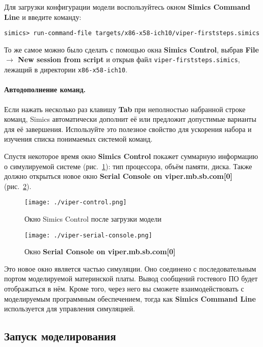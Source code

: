 Для загрузки конфигурации модели воспользуйтесь окном \textbf{Simics Command Line} и введите команду:

\begin{lstlisting}
simics> run-command-file targets/x86-x58-ich10/viper-firststeps.simics
\end{lstlisting}

То же самое можно было сделать с помощью окна \textbf{Simics Control}, выбрав \textbf{File $\to$ New session from script} и открыв файл \texttt{viper-firststeps.simics}, лежащий в директории \texttt{x86-x58-ich10}.

\paragraph{Автодополнение команд.} Если нажать несколько раз клавишу \textbf{Tab} при неполностью набранной строке команд, Simics автоматически дополнит её или предложит допустимые варианты для её завершения. Используйте это полезное свойство для ускорения набора и изучения списка понимаемых системой команд.

Спустя некоторое время окно \textbf{Simics Control} покажет суммарную информацию о симулируемой системе (рис.~\ref{fig:viper-control}): тип процессора, объём памяти, диска. Также должно открыться новое окно \textbf{Serial Console on viper.mb.sb.com[0]} (рис.~\ref{fig:viper-serial-console}).

\begin{figure}[ht]
    \centering
    \texttt{[image: ./viper-control.png]}
    \caption{Окно Simics Control после загрузки модели}
    \label{fig:viper-control}
\end{figure}

\begin{figure}[ht]
    \centering
    \texttt{[image: ./viper-serial-console.png]}
    \caption[Окно Serial Console]{Окно \textbf{Serial Console on viper.mb.sb.com[0]}}
    \label{fig:viper-serial-console}
\end{figure}

Это новое окно является частью симуляции. Оно соединено с последовательным портом моделируемой материнской платы. Вывод сообщений гостевого ПО будет отображаться в нём. Кроме того, через него вы сможете взаимодействовать с моделируемым программным обеспечением, тогда как \textbf{Simics Command Line} используется для управления симуляцией.

\subsection{Запуск моделирования}

